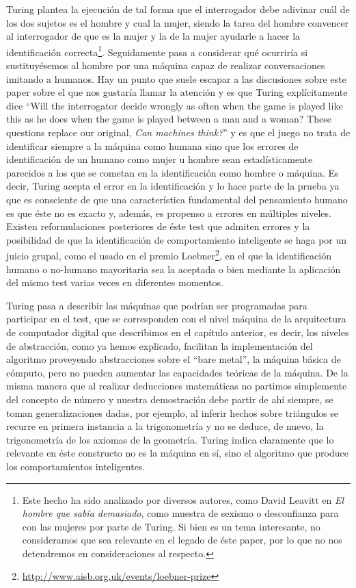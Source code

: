 \documentclass[12pt]{memoir}
\begin{document}
Turing plantea la ejecución de tal forma que el interrogador debe adivinar cuál de los dos sujetos es el hombre y cual la mujer, siendo la tarea del hombre convencer al interrogador de que es la mujer y la de la mujer ayudarle a hacer la identificación correcta\footnote{Este hecho ha sido analizado por diversos autores, como David Leavitt en \textit{El hombre que sabía demasiado}, como muestra de sexismo o desconfianza para con las mujeres por parte de Turing. Si bien es un tema interesante, no consideramos que sea relevante en el legado de éste paper, por lo que no nos detendremos en consideraciones al respecto.}. Seguidamente pasa a considerar qué ocurriría si sustituyésemos al hombre por una máquina capaz de realizar conversaciones imitando a humanos. Hay un punto que suele escapar a las discusiones sobre este paper sobre el que nos gustaría llamar la atención y es que Turing explícitamente dice ``Will the interrogator decide wrongly as often when the game is played like this as he does when the game is played between a man and a woman? These questions replace our original, \textit{Can machines think?}'' y es que el juego no trata de identificar siempre a la máquina como humana sino que los errores de identificación de un humano como mujer u hombre sean estadísticamente parecidos a los que se cometan en la identificación como hombre o máquina. Es decir, Turing acepta el error en la identificación y lo hace parte de la prueba ya que es consciente de que una característica fundamental del pensamiento humano es que éste no es exacto y, además, es propenso a errores en múltiples niveles. Existen reformulaciones posteriores de éste test que admiten errores y la posibilidad de que la identificación de comportamiento inteligente se haga por un juicio grupal, como el usado en el premio Loebner\footnote{\url{http://www.aisb.org.uk/events/loebner-prize} }, en el que la identificación humano o no-humano mayoritaria sea la aceptada o bien mediante la aplicación del mismo test varias veces en diferentes momentos. 

Turing pasa a describir las máquinas que podrían ser programadas para participar en el test, que se corresponden con el nivel máquina de la arquitectura de computador digital que describimos en el capítulo anterior, es decir, los niveles de abstracción, como ya hemos explicado, facilitan la implementación del algoritmo proveyendo abstracciones sobre el ``bare metal'', la máquina básica de cómputo, pero no pueden aumentar las capacidades teóricas de la máquina. De la misma manera que al realizar deducciones matemáticas no partimos simplemente del concepto de número y nuestra demostración debe partir de ahí siempre, se toman generalizaciones dadas, por ejemplo, al inferir hechos sobre triángulos se recurre en primera instancia a la trigonometría y no se deduce, de nuevo, la trigonometría de los axiomas de la geometría. Turing indica claramente que lo relevante en éste constructo no es la máquina en sí, sino el algoritmo que produce los comportamientos inteligentes.
\end{document}
